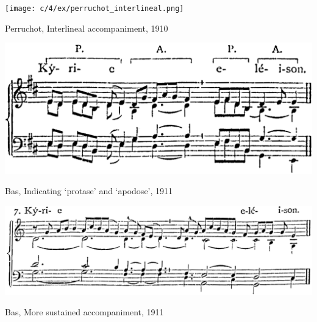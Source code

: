 \vspace*{\fill}

\newpage

\vspace*{\fill}

\begin{example}
  \centering
  \texttt{[image: c/4/ex/perruchot\_interlineal.png]}
  \caption{Perruchot, Interlineal accompaniment, 1910}
  \label{mus:perruchot_interlineal}
\end{example}

\vspace*{\fill}

\newpage

\vspace*{\fill}

\begin{example}
  \centering
  \includegraphics[width=.9\linewidth]{c/5/ex/bas_antcons_116.png}
  \caption{Bas, Indicating `protase' and `apodose', 1911}
  \label{mus:bas_antcons_116}
\end{example}

\vspace*{\fill}

\begin{example}
  \centering
  \includegraphics[width=\linewidth]{c/5/ex/bas_kyriesustained_149.png}
  \caption{Bas, More sustained accompaniment, 1911}
  \label{mus:bas_kyriesustained_149}
\end{example}

\vspace*{\fill}

\newpage

